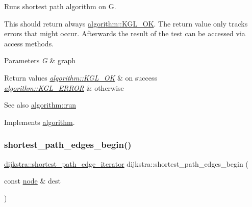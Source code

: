Runs shortest path algorithm on {\ttfamily G}. 

This should return always \mbox{\hyperlink{classalgorithm_af1a0078e153aa99c24f9bdf0d97f6710aae4c1cd7fe8d8cf4b143241a6e7c31cf}{algorithm\+::\+K\+G\+L\+\_\+\+OK}}. The return value only tracks errors that might occur. Afterwards the result of the test can be accessed via access methods.


\begin{DoxyParams}{Parameters}
{\em G} & graph\\
\hline
\end{DoxyParams}

\begin{DoxyRetVals}{Return values}
{\em \mbox{\hyperlink{classalgorithm_af1a0078e153aa99c24f9bdf0d97f6710aae4c1cd7fe8d8cf4b143241a6e7c31cf}{algorithm\+::\+K\+G\+L\+\_\+\+OK}}} & on success \\
\hline
{\em \mbox{\hyperlink{classalgorithm_af1a0078e153aa99c24f9bdf0d97f6710ae67bf27b2ef31f73e545a7f9f4a69556}{algorithm\+::\+K\+G\+L\+\_\+\+E\+R\+R\+OR}}} & otherwise\\
\hline
\end{DoxyRetVals}
\begin{DoxySeeAlso}{See also}
\mbox{\hyperlink{classalgorithm_a734b189509a8d6b56b65f8ff772d43ca}{algorithm\+::run}} 
\end{DoxySeeAlso}


Implements \mbox{\hyperlink{classalgorithm_a734b189509a8d6b56b65f8ff772d43ca}{algorithm}}.

\mbox{\label{classdijkstra_ad7ef6f747b68f8951322b265844dbb8a}} 
\subsubsection{\texorpdfstring{shortest\+\_\+path\+\_\+edges\+\_\+begin()}{shortest\_path\_edges\_begin()}}
{\footnotesize\ttfamily \mbox{\hyperlink{classdijkstra_ad35d95d4ed7a4202a5d048a63aa115b9}{dijkstra\+::shortest\+\_\+path\+\_\+edge\+\_\+iterator}} dijkstra\+::shortest\+\_\+path\+\_\+edges\+\_\+begin (\begin{DoxyParamCaption}\item[{const \mbox{\hyperlink{classnode}{node}} \&}]{dest }\end{DoxyParamCaption})}



